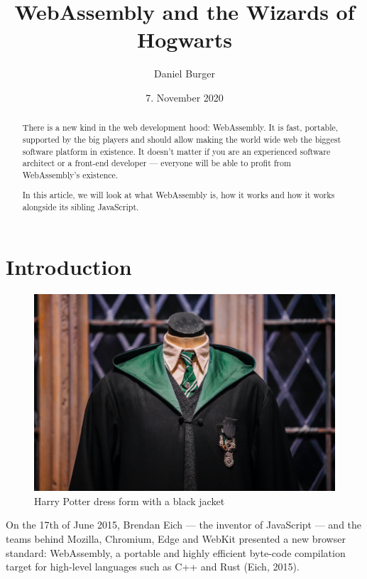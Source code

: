 \documentclass[11pt]{article}
\title{WebAssembly and the Wizards of Hogwarts}
\author{Daniel Burger}
\date{7. November 2020}
\begin{document}
\maketitle
\pagebreak

\begin{abstract}
  There is a new kind in the web development hood: WebAssembly. It is fast, portable, supported by the big players and should allow making the world wide web the biggest software platform in existence. It doesn’t matter if you are an experienced software architect or a front-end developer — everyone will be able to profit from WebAssembly’s existence.

  In this article, we will look at what WebAssembly is, how it works and how it works alongside its sibling JavaScript.

\end{abstract}
\pagebreak

\tableofcontents
\pagebreak

\section{Introduction}
\label{sec:introduction}

\begin{figure}[ht]
  \centering
  \includegraphics[width=\textwidth]{figures/001.jpg}
  \caption{Harry Potter dress form with a black jacket \citep{unsplash_beautiful_2018}}
  \label{fig:cover}
\end{figure}

On the 17th of June 2015, Brendan Eich — the inventor of JavaScript — and the teams behind Mozilla, Chromium, Edge and WebKit presented a new browser standard: WebAssembly, a portable and highly efficient byte-code compilation target for high-level languages such as C++ and Rust (Eich, 2015).
\end{document}
